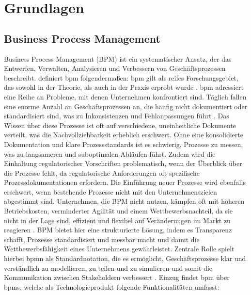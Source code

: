 \chapter{Grundlagen}
    \section{Business Process Management}
        Business Process Management (BPM) ist ein systematischer Ansatz, der das Entwerfen, Verwalten, Analysieren und Verbessern von Geschäftsprozessen beschreibt. \citet{Weske2019} definiert \gls{bpm} folgendermaßen:  \gls{bpm} gilt als reifes Forschungsgebiet, das sowohl in der Theorie, als auch in der Praxis erprobt wurde \citep{König2020RPA-BPMS}. \gls{bpm} adressiert eine Reihe an Probleme, mit denen Unternehmen konfrontiert sind. Täglich fallen eine enorme Anzahl an Geschäftsprozessen an, die häufig nicht dokumentiert oder standardisiert sind, was zu Inkonsistenzen und Fehlanpassungen führt \citep{Dumas2018}. Das Wissen über diese Prozesse ist oft auf verschiedene, uneinheitliche Dokumente verteilt, was die Nachvollziehbarkeit erheblich erschwert. Ohne eine konsolidierte Dokumentation und klare Prozessstandards ist es schwierig, Prozesse zu messen, was zu langsameren und suboptimalen Abläufen führt. Zudem wird die Einhaltung regulatorischer Vorschriften problematisch, wenn der Überblick über die Prozesse fehlt, da regulatorische Anforderungen oft spezifische Prozessdokumentationen erfordern. Die Einführung neuer Prozesse wird ebenfalls erschwert, wenn bestehende Prozesse nicht mit den Unternehmenszielen abgestimmt sind. Unternehmen, die BPM nicht nutzen, kämpfen oft mit höheren Betriebskosten, verminderter Agilität und einem Wettbewerbsnachteil, da sie nicht in der Lage sind, effizient und flexibel auf Veränderungen im Markt zu reagieren \citep{BEEREPOOT2023103837}. BPM bietet hier eine strukturierte Lösung, indem es Transparenz schafft, Prozesse standardisiert und messbar macht und damit die  Wettbewerbsfähigkeit eines Unternehmens gewährleistet. Zentrale Rolle spielt hierbei \gls{bpmn} als Standardnotation, die es ermöglicht, Geschäftsprozesse klar und verständlich zu modellieren, zu teilen und zu simulieren und somit die Kommunikation zwischen Stakeholdern verbessert \citep{Dumas2018}. Einzug findet \gls{bpm} über \gls{bpms}, welche als Technologieprodukt folgende Funktionalitäten umfasst:
